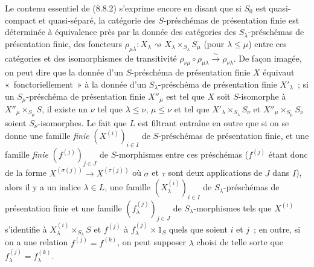 \begin{scholium}[8.8.3]
\label{IV.8.8.3-fr}
Le contenu essentiel de (8.8.2) s'exprime encore en disant que si $S_0$ est
quasi-compact et quasi-séparé, la catégorie des $S$-préschémas de présentation
finie est déterminée à équivalence près par la donnée des catégories des
$S_\lambda$-préschémas de présentation finie, des foncteurs
$\rho_{\mu\lambda}:X_\lambda\rightsquigarrow
X_\lambda\times_{S_\lambda}S_\mu$ (pour $\lambda\leq\mu$) entre ces catégories
et des isomorphismes de transitivité
$\rho_{\nu\mu}\circ\rho_{\mu\lambda}\xrightarrow{\sim}\rho_{\nu\lambda}$. De
façon imagée, on peut dire que la donnée d'un $S$-préschéma de présentation
finie $X$ équivaut «~fonctoriellement~» à la donnée d'un
$S_\lambda$-préschéma de présentation finie $X'_\lambda$~; si un
$S_\mu$-préschéma de présentation finie $X''_\mu$ est tel que $X$ soit
$S$-isomorphe à $X''_\mu\times_{S_\mu}S$, il existe un $\nu$ tel que
$\lambda\leq\nu$, $\mu\leq\nu$ et tel que
$X'_\lambda\times_{S_\lambda}S_\nu$ et
$X''_\mu\times_{S_\mu}S_\nu$ soient $S_\nu$-isomorphes. Le fait que $L$ est
filtrant entraîne en outre que si on se donne une famille \emph{finie}
$(X^{(i)})_{i\in I}$ de $S$-préschémas de présentation finie, et une famille
\emph{finie} $(f^{(j)})_{j\in J}$ de $S$-morphismes entre ces préschémas
($f^{(j)}$ étant donc de la forme
$X^{(\sigma(j))}\to X^{(\tau(j))}$ où $\sigma$ et $\tau$ sont deux
applications de $J$ dans $I$), alors il y a un indice $\lambda\in L$, une
famille $(X_\lambda^{(i)})_{i\in I}$ de $S_\lambda$-préschémas de présentation
finie et une famille $(f_\lambda^{(j)})_{j\in J}$ de $S_\lambda$-morphismes
tels que $X^{(i)}$ s'identifie à
$X_\lambda^{(i)}\times_{S_\lambda}S$ et $f^{(j)}$ à
$f_\lambda^{(j)}\times1_S$ quels que soient $i$ et $j$~; en outre, si on a
une relation $f^{(j)}=f^{(k)}$, on peut supposer $\lambda$ choisi de telle
sorte que $f_\lambda^{(j)}=f_\lambda^{(k)}$.


\end{scholium}
